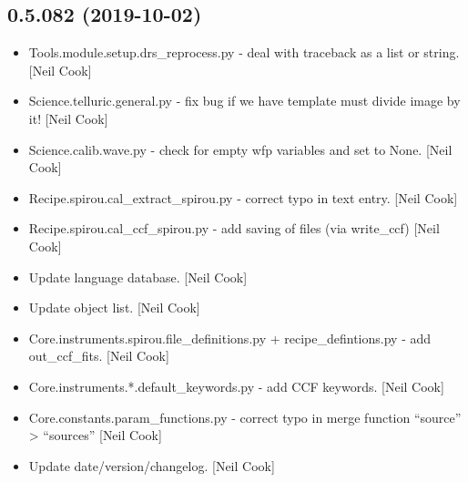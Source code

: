 \documentclass[a4paper,10pt,english]{report}
\begin{document}
\subsection{0.5.082 (2019-10-02)}
\label{\detokenize{misc/changelog:id59}}\begin{itemize}
\item {} 
Tools.module.setup.drs\_reprocess.py - deal with traceback as a list or
string. {[}Neil Cook{]}

\item {} 
Science.telluric.general.py - fix bug if we have template must divide
image by it! {[}Neil Cook{]}

\item {} 
Science.calib.wave.py - check for empty wfp variables and set to None.
{[}Neil Cook{]}

\item {} 
Recipe.spirou.cal\_extract\_spirou.py - correct typo in text entry.
{[}Neil Cook{]}

\item {} 
Recipe.spirou.cal\_ccf\_spirou.py - add saving of files (via write\_ccf)
{[}Neil Cook{]}

\item {} 
Update language database. {[}Neil Cook{]}

\item {} 
Update object list. {[}Neil Cook{]}

\item {} 
Core.instruments.spirou.file\_definitions.py + recipe\_defintions.py -
add out\_ccf\_fits. {[}Neil Cook{]}

\item {} 
Core.instruments.*.default\_keywords.py - add CCF keywords. {[}Neil Cook{]}

\item {} 
Core.constants.param\_functions.py - correct typo in merge function
“source” \textendash{}\textgreater{} “sources” {[}Neil Cook{]}

\item {} 
Update date/version/changelog. {[}Neil Cook{]}

\end{itemize}
\end{document}
